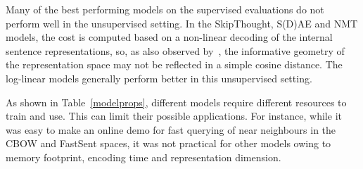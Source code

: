 \documentclass[11pt,letterpaper]{article}
\begin{document}
\vspace{35pt} Many of the best performing models on the supervised evaluations do not perform well in the unsupervised setting. In the SkipThought, S(D)AE and NMT models, the cost is computed based on a non-linear decoding of the internal sentence representations, so, as also observed by~\cite{almahairi2015learning}, the informative geometry of the representation space may not be reflected in a simple cosine distance. The log-linear models generally perform better in this unsupervised setting. 

\vspace{5pt}
As shown in Table~\ref{modelprops}, different models require different resources to train and use. This can limit their possible applications. For instance, while it was easy to make an online demo for fast querying of near neighbours in the CBOW and FastSent spaces, it was not practical for other models owing to memory footprint, encoding time and representation dimension. 
\end{document}
